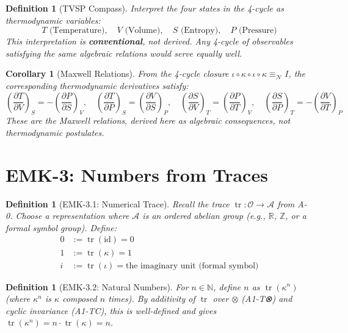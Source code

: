 \documentclass[12pt, oneside]{article}
\newtheorem{corollary}[theorem]{Corollary}
\newtheorem{definition}[theorem]{Definition}
\DeclareMathOperator{\tr}{tr}
\newcommand{\N}{\mathcal{N}}
\newcommand{\A}{\mathcal{A}}
\newcommand{\Opr}{\mathcal{O}}
\begin{document}
\begin{definition}[TVSP Compass]
Interpret the four states in the 4-cycle as thermodynamic variables:
\[
\boxed{T \text{ (Temperature)}, \quad V \text{ (Volume)}, \quad S \text{ (Entropy)}, \quad P \text{ (Pressure)}}
\]
This interpretation is \textbf{conventional}, not derived. Any 4-cycle of observables satisfying the same algebraic relations would serve equally well.
\end{definition}

\begin{corollary}[Maxwell Relations]
From the 4-cycle closure $\iota \circ \kappa \circ \iota \circ \kappa \equiv_\N I$, the corresponding thermodynamic derivatives satisfy:
\[
\left(\frac{\partial T}{\partial V}\right)_S = -\left(\frac{\partial P}{\partial S}\right)_V,\quad
\left(\frac{\partial T}{\partial P}\right)_S = \left(\frac{\partial V}{\partial S}\right)_P,\quad
\left(\frac{\partial S}{\partial V}\right)_T = \left(\frac{\partial P}{\partial T}\right)_V,\quad
\left(\frac{\partial S}{\partial P}\right)_T = -\left(\frac{\partial V}{\partial T}\right)_P
\]
These are the Maxwell relations, derived here as algebraic consequences, not thermodynamic postulates.
\end{corollary}

\section{EMK-3: Numbers from Traces}

\begin{definition}[EMK-3.1: Numerical Trace]
Recall the trace $\tr: \Opr \rightarrow \A$ from A-0. Choose a representation where $\A$ is an ordered abelian group (e.g., $\mathbb{R}$, $\mathbb{Z}$, or a formal symbol group). Define:
\begin{align*}
0 &:= \tr(\text{id}) = 0 \\
1 &:= \tr(\kappa) = 1 \\
i &:= \tr(\iota) = \text{the imaginary unit (formal symbol)}
\end{align*}
\end{definition}

\begin{definition}[EMK-3.2: Natural Numbers]
For $n \in \mathbb{N}$, define $n$ as $\tr(\kappa^n)$ (where $\kappa^n$ is $\kappa$ composed $n$ times). By additivity of $\tr$ over $\otimes$ (A1-T⊗) and cyclic invariance (A1-TC), this is well-defined and gives $\tr(\kappa^n) = n \cdot \tr(\kappa) = n$.
\end{definition}
\end{document}
